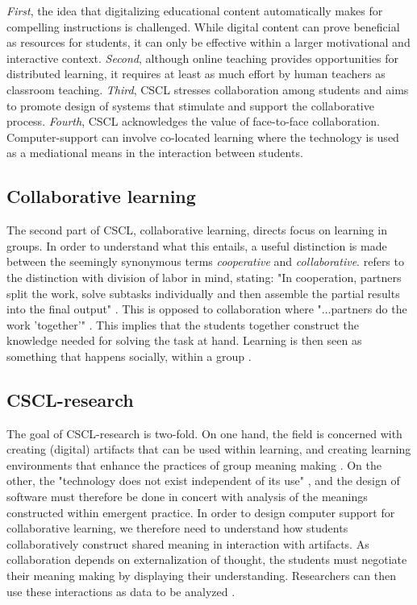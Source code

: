 \emph{First}, the idea that digitalizing educational content automatically makes for compelling instructions is challenged. While digital content can prove beneficial as resources for students, it can only be effective within a larger motivational and interactive context. \emph{Second}, although online teaching provides opportunities for distributed learning, it requires at least as much effort by human teachers as classroom teaching. \emph{Third}, CSCL stresses collaboration among students and aims to promote design of systems that stimulate and support the collaborative process. \emph{Fourth}, CSCL acknowledges the value of face-to-face collaboration. Computer-support can involve co-located learning where the technology is used as a mediational means in the interaction between students.

\subsection{Collaborative learning}
The second part of CSCL, collaborative learning, directs focus on learning in groups. In order to understand what this entails, a useful distinction is made between the seemingly synonymous terms \emph{cooperative} and \emph{collaborative}. \citet*{dillenbourg1999you} refers to the distinction with division of labor in mind, stating: "In cooperation, partners split the work, solve subtasks individually and then assemble the partial results into the final output" \citep[p. 8]{dillenbourg1999you}. This is opposed to collaboration where "...partners do the work 'together'" \citep{dillenbourg1999you}. This implies that the students together construct the knowledge needed for solving the task at hand. Learning is then seen as something that happens socially, within a group \citep{stahl2006computer}. 

\subsection{CSCL-research}
The goal of CSCL-research is two-fold. On one hand, the field is concerned with creating (digital) artifacts that can be used within learning, and creating learning environments that enhance the practices of group meaning making \citep{stahl2006computer}. On the other, the "technology does not exist independent of its use" \citep[\citealp{LeBaron2002} referenced in][]{stahl2006computer}, and the design of software must therefore be done in concert with analysis of the meanings constructed within emergent practice. In order to design computer support for collaborative learning, we therefore need to understand how students collaboratively construct shared meaning in interaction with artifacts. As collaboration depends on externalization of thought, the students must negotiate their meaning making by displaying their understanding. Researchers can then use these interactions as data to be analyzed \citep{stahl2006computer}.

